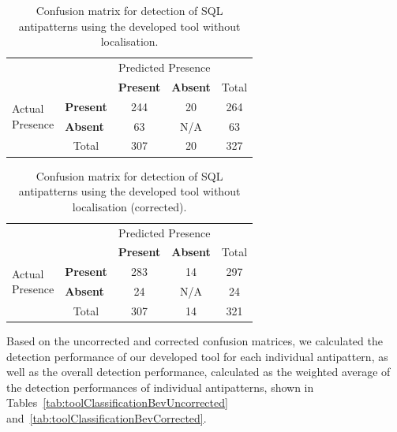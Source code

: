 \begin{table}[H]
    \centering
    \caption{Confusion matrix for detection of SQL antipatterns using the developed tool without localisation.}
    \label{tab:toolClassificationConfusion}
    \begin{tabular}{l|l|c|c|c}
        \multicolumn{2}{c}{}&\multicolumn{2}{c}{Predicted Presence}&\\
        \cline{3-4}
        \multicolumn{2}{c|}{}&\textbf{Present}&\textbf{Absent}&\multicolumn{1}{c}{Total}\\
        \cline{2-4}
        \multirow{2}{1.5cm}{Actual\\Presence}& \textbf{Present} & 244 & 20 & 264\\
        \cline{2-4}
        & \textbf{Absent} & 63 & N/A & 63\\
        \cline{2-4}
        \multicolumn{1}{c}{} & \multicolumn{1}{c}{Total} & \multicolumn{1}{c}{307} & \multicolumn{1}{c}{20} & \multicolumn{1}{c}{327}\\
    \end{tabular}
\end{table}

\begin{table}[H]
    \centering
    \caption{Confusion matrix for detection of SQL antipatterns using the developed tool without localisation (corrected).}
    \label{tab:toolClassificationConfusionCorrected}
    \begin{tabular}{l|l|c|c|c}
        \multicolumn{2}{c}{}&\multicolumn{2}{c}{Predicted Presence}&\\
        \cline{3-4}
        \multicolumn{2}{c|}{}&\textbf{Present}&\textbf{Absent}&\multicolumn{1}{c}{Total}\\
        \cline{2-4}
        \multirow{2}{1.5cm}{Actual\\Presence}& \textbf{Present} & 283 & 14 & 297\\
        \cline{2-4}
        & \textbf{Absent} & 24 & N/A & 24\\
        \cline{2-4}
        \multicolumn{1}{c}{} & \multicolumn{1}{c}{Total} & \multicolumn{1}{c}{307} & \multicolumn{1}{c}{14} & \multicolumn{1}{c}{321}\\
    \end{tabular}
\end{table}

Based on the uncorrected and corrected confusion matrices, we calculated the detection performance of our developed tool for each individual antipattern, as well as the overall detection performance, calculated as the weighted average of the detection performances of individual antipatterns, shown in Tables~\ref{tab:toolClassificationBevUncorrected} and~\ref{tab:toolClassificationBevCorrected}.


